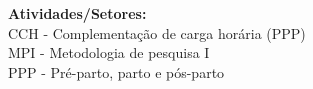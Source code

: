 {\fontsize{10pt}{12pt}\selectfont
\noindent
\textbf{Atividades/Setores:}\\
CCH - Complementação de carga horária (PPP)\\
MPI - Metodologia de pesquisa I\\
PPP - Pré-parto, parto e pós-parto
}